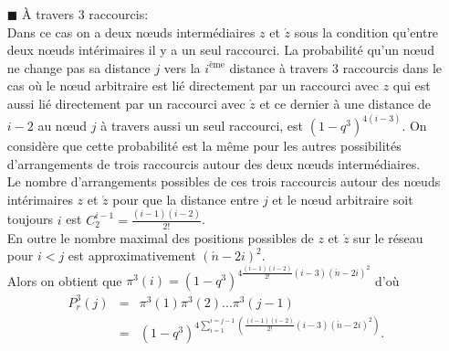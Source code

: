 \begin{itemize}
\item[$\blacksquare$]  \`{A} travers $3$ raccourcis:\\
	Dans ce cas on a deux nœuds intermédiaires $z$ et $\acute{z}$ sous la condition qu'entre deux nœuds intérimaires il y a un seul raccourci.
	La probabilité qu'un nœud ne change pas sa distance $j$ vers la $i^{\text{ème}}$ distance à travers $3$ raccourcis dans le cas où le
	nœud arbitraire est lié directement par un raccourci avec $z$ qui est aussi lié directement par un raccourci avec $\acute{z}$ et ce 
	dernier à une distance de $i-2$ au nœud $j$ à travers aussi un seul raccourci, est $(1-q^3)^{4(i-3)}$. On considère que cette probabilité est la m\^{e}me
	pour les autres possibilités d'arrangements de trois raccourcis autour des deux nœuds intermédiaires.\\
	Le nombre d'arrangements possibles de ces trois raccourcis autour des nœuds intérimaires $z$ et $\acute{z}$ pour que la distance entre $j$ et le	nœud arbitraire soit toujours $i$ est $C_2^{i-1}=\frac{(i-1)(i-2)}{2!}$.\\
	 En outre le nombre maximal des positions possibles de $z$ et
	$\acute{z}$ sur le réseau pour $i<j$ est approximativement $(\acute{n}-2i)^2$.\\
	
	Alors on obtient que $\pi^3(i)=(1-q^3)^{4\frac{(i-1)(i-2)}{2!}(i-3)(\acute{n}-2i)^2}\nonumber$ d'où
	\begin{eqnarray}
	P_r^3(j)&=&\pi^3(1)\pi^3(2)...\pi^3(j-1)\\\nonumber
	&=& (1-q^3)^{4\sum_{i=1}^{i=j-1}(\frac{(i-1)(i-2)}{2!}(i-3)(\acute{n}-2i)^2)}.
	\end{eqnarray}
	

\end{itemize}
